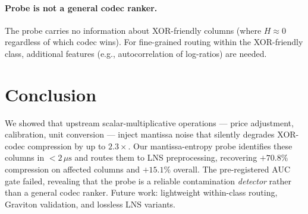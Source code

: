 \documentclass[sigconf]{acmart}
\begin{document}
\paragraph{Probe is not a general codec ranker.}
The probe carries no information about XOR-friendly columns (where $H \approx 0$
regardless of which codec wins).  For fine-grained routing within the
XOR-friendly class, additional features (e.g., autocorrelation of log-ratios)
are needed.

\section{Conclusion}
\label{sec:conclusion}

We showed that upstream scalar-multiplicative operations — price adjustment,
calibration, unit conversion — inject mantissa noise that silently degrades
XOR-codec compression by up to $2.3\times$.  Our mantissa-entropy probe
identifies these columns in $< 2\,\mu\text{s}$ and routes them to LNS
preprocessing, recovering $+70.8\%$ compression on affected columns and
$+15.1\%$ overall.  The pre-registered AUC gate failed, revealing that the
probe is a reliable contamination \emph{detector} rather than a general
codec ranker.  Future work: lightweight within-class routing, Graviton
validation, and lossless LNS variants.


\end{document}
